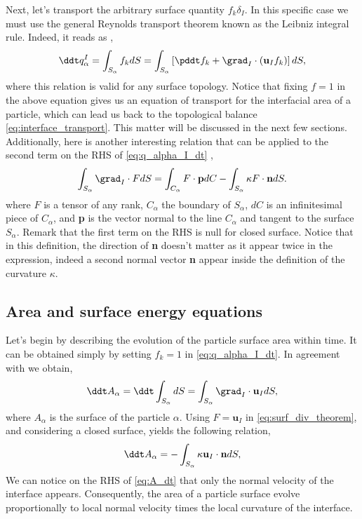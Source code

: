 Next, let's transport the arbitrary surface quantity $f_k \delta_I$.
In this specific case we must use the general Reynolds transport theorem known as the Leibniz integral rule. 
Indeed, it reads as \citep[Appendix B]{morel2015mathematical}, 
\begin{equation}
    \ddt  q^I_\alpha
    = \int_{S_\alpha} f_k dS 
    = \int_{S_\alpha} \left[
        \pddt f_k 
        +   \grad_I \cdot (\textbf{u}_If_k)
    \right]dS,
    \label{eq:q_alpha_I_dt}
\end{equation}
where this relation is valid for any surface topology. 
Notice that fixing $f=1$ in the above equation gives us an equation of transport for the interfacial area of a particle, which can lead us back to the topological balance \ref{eq:interface_transport}. 
This matter will be discussed in the next few sections. 
Additionally, here is another interesting relation that can be applied to the second term on the RHS of \ref{eq:q_alpha_I_dt} \citep[Appendix B]{tryggvason2011direct}, 
\begin{equation}
    \int_{S_\alpha}  \grad_I  \cdot F dS
    = \int_{C_\alpha} F \cdot \textbf{p} dC
    - \int_{S_\alpha} \kappa F \cdot \textbf{n} dS. 
    \label{eq:surf_div_theorem}
\end{equation}
where $F$ is a tensor of any rank, $C_\alpha$ the boundary of $S_\alpha$, $dC$ is an infinitesimal piece of $C_\alpha$, and \textbf{p} is the vector normal to the line $C_\alpha$ and tangent to the surface $S_\alpha$.
Remark that the first term on the RHS is null for closed surface. 
Notice that in this definition, the direction of \textbf{n} doesn't matter as it appear twice in the expression, indeed a second normal vector \textbf{n} appear inside the definition of the curvature $\kappa$. 

\subsection{Area and surface energy equations}

Let's begin by describing the evolution of the particle surface area within time.
It can be obtained simply by setting $f_k = 1$ in \ref{eq:q_alpha_I_dt}.  
In agreement with \citet{morel2007surface} we obtain,  
\begin{equation*}
    \ddt A_\alpha
    = \ddt \int_{S_\alpha} dS
    = \int_{S_\alpha} \grad_I \cdot \textbf{u}_I dS,
\end{equation*}
where $A_\alpha$ is the surface of the particle $\alpha$. 
Using $F = \textbf{u}_I$ in \ref{eq:surf_div_theorem}, and considering a closed surface, yields the following relation, 
\begin{equation}
    \ddt A_\alpha
    = - \int_{S_\alpha} \kappa \textbf{u}_I \cdot \textbf{n} dS,
    \label{eq:A_dt}
\end{equation}
We can notice on the RHS of \ref{eq:A_dt} that only the normal velocity of the interface appears.
Consequently, the area of a particle surface evolve proportionally to local normal velocity times the local curvature of the interface. 

